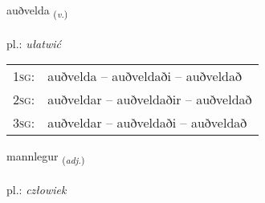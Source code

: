 \documentclass[frontgrid, backgrid]{flacards}\usepackage[]{graphicx}\usepackage[]{xcolor}
\begin{document}
\renewcommand{\flhead}{\vskip5pt \fboxsep=0pt {\small\bfseries\footnotesize Sagnorð | Verb}}
\renewcommand{\fcfoot}{\vskip5pt \fboxsep=0pt \hspace{2pt}{\small\bfseries\footnotesize 2K}}

\renewcommand{\blhead}{\vskip5pt {\small\bfseries\footnotesize Sagnorð | Verb }}
\renewcommand{\bcfoot}{\vskip5pt \hspace{2pt}{\small\bfseries\footnotesize 2K}}


{auðvelda \small{\textsubscript{(\textit{v.})}} \\[1ex] %
\textphonetic{[œiðvɛlta]} \\
pl.: \emph{ułatwić} \\  [2ex]
\renewcommand*{\arraystretch}{0.8}
\begin{tabular}{p{1cm}l}
\textsc{1sg}: & auðvelda -- auðveldaði -- auðveldað \\ 
\textsc{2sg}: & auðveldar -- auðveldaðir -- auðveldað \\ 
\textsc{3sg}: & auðveldar -- auðveldaði -- auðveldað \\ 
\end{tabular}
}

\renewcommand{\flhead}{\vskip5pt \fboxsep=0pt {\small\bfseries\footnotesize Lýsingarorð | Adjective}}
\renewcommand{\fcfoot}{\vskip5pt \fboxsep=0pt \hspace{2pt}{\small\bfseries\footnotesize 2K}}

\renewcommand{\blhead}{\vskip5pt {\small\bfseries\footnotesize Lýsingarorð | Adjective }}
\renewcommand{\bcfoot}{\vskip5pt \hspace{2pt}{\small\bfseries\footnotesize 2K}}


{mannlegur \small{\textsubscript{(\textit{adj.})}} \\[1ex] %
\textphonetic{[manlɛɣʏr]} \\
pl.: \emph{człowiek} \\  [2ex]
\renewcommand*{\arraystretch}{0.8}
}
\end{document}
